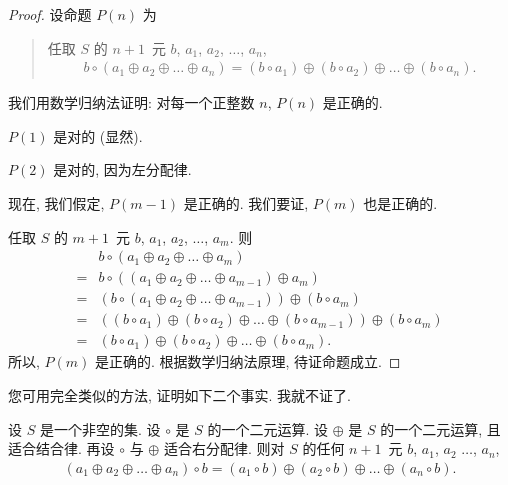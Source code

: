\begin{proof}
    设命题 \(P(n)\) 为
    \begin{quotation}
        任取 \(S\) 的 \(n + 1\)~元
        \(b\), \(a_1\), \(a_2\), \(\dots\), \(a_n\),
        \begin{align*}
            b \circ (a_1 \oplus a_2 \oplus \dots \oplus a_n)
            =
            (b \circ a_1) \oplus (b \circ a_2) \oplus
            \dots     \oplus (b \circ a_n).
        \end{align*}
    \end{quotation}
    我们用数学归纳法证明:
    对每一个正整数 \(n\), \(P(n)\) 是正确的.

    \(P(1)\) 是对的 (显然).

    \(P(2)\) 是对的, 因为左分配律.

    现在, 我们假定, \(P(m-1)\) 是正确的.
    我们要证, \(P(m)\) 也是正确的.

    任取 \(S\) 的 \(m + 1\)~元
    \(b\), \(a_1\), \(a_2\), \(\dots\), \(a_m\).
    则
    \begin{align*}
             &
        b \circ (a_1 \oplus a_2 \oplus \dots \oplus a_m)
        \\
        = {} &
        b \circ ((a_1 \oplus a_2 \oplus \dots \oplus a_{m-1})
        \oplus a_m)
        \\
        = {} &
        (b \circ (a_1 \oplus a_2 \oplus \dots \oplus a_{m-1}))
        \oplus (b \circ a_m)
        \\
        = {} &
        ((b \circ a_1) \oplus (b \circ a_2) \oplus
        \dots \oplus (b \circ a_{m-1}))
        \oplus (b \circ a_m)
        \\
        = {} &
        (b \circ a_1) \oplus (b \circ a_2) \oplus
        \dots \oplus (b \circ a_m).
    \end{align*}
    所以, \(P(m)\) 是正确的.
    根据数学归纳法原理, 待证命题成立.
\end{proof}

您可用完全类似的方法, 证明如下二个事实.
我就不证了.

\begin{theorem}
    设 \(S\) 是一个非空的集.
    设 \(\circ\) 是 \(S\) 的一个二元运算.
    设 \(\oplus\) 是 \(S\) 的一个二元运算,
    且适合结合律.
    再设 \(\circ\) 与 \(\oplus\) 适合右分配律.
    则对 \(S\) 的任何 \(n + 1\)~元
    \(b\), \(a_1\), \(a_2\) \(\dots\), \(a_n\),
    \begin{align*}
        (a_1 \oplus a_2 \oplus \dots \oplus a_n) \circ b
        =
        (a_1 \circ b) \oplus (a_2 \circ b) \oplus
        \dots \oplus (a_n \circ b).
    \end{align*}
\end{theorem}

